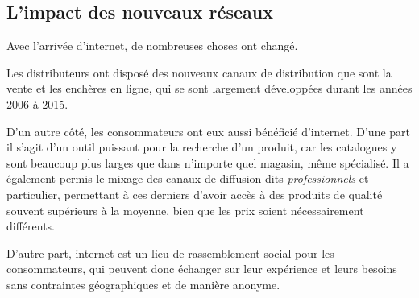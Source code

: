\subsection{L'impact des nouveaux réseaux}

Avec l'arrivée d'internet, de nombreuses choses ont changé.

\medbreak
Les distributeurs ont disposé des nouveaux canaux de distribution que sont la vente et les enchères en ligne, qui se sont largement développées durant les années 2006 à 2015.

\medbreak
D'un autre côté, les consommateurs ont eux aussi bénéficié d'internet.
\smallbreak
D'une part il s'agit d'un outil puissant pour la recherche d'un produit, car les catalogues y sont beaucoup plus larges que dans n'importe quel magasin, même spécialisé. Il a également permis le mixage des canaux de diffusion dits \textit{professionnels} et {particulier}, permettant à ces derniers d'avoir accès à des produits de qualité souvent supérieurs à la moyenne, bien que les prix soient nécessairement différents.

D'autre part, internet est un lieu de rassemblement social pour les consommateurs, qui peuvent donc échanger sur leur expérience et leurs besoins sans contraintes géographiques et de manière anonyme.